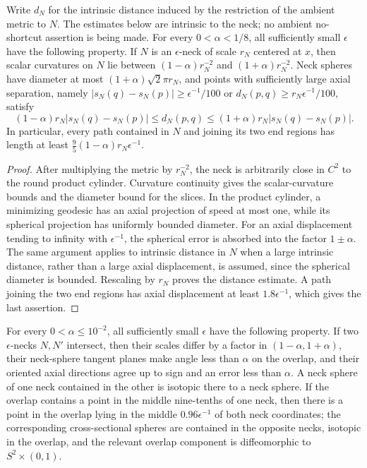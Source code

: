 \begin{lemma}
\label{lem:epsilon-neck-metric-control}
\notready
Write $d_N$ for the intrinsic distance induced by the restriction of the
ambient metric to $N$.  The estimates below are intrinsic to the neck; no
ambient no-shortcut assertion is being made.
For every $0<\alpha<1/8$, all sufficiently small $\epsilon$ have the
following property.  If $N$ is an $\epsilon$-neck of scale $r_N$ centered
at $x$, then scalar curvatures on $N$ lie between
$(1-\alpha)r_N^{-2}$ and $(1+\alpha)r_N^{-2}$.  Neck spheres have
diameter at most $(1+\alpha)\sqrt2\pi r_N$, and points with sufficiently
large axial separation, namely
$|s_N(q)-s_N(p)|\ge\epsilon^{-1}/100$ or
$d_N(p,q)\ge r_N\epsilon^{-1}/100$, satisfy
\[
 (1-\alpha)r_N|s_N(q)-s_N(p)|
 \le d_N(p,q)
 \le(1+\alpha)r_N|s_N(q)-s_N(p)|.
\]
In particular, every path contained in $N$ and joining its two end regions
has length at least
$\frac95(1-\alpha)r_N\epsilon^{-1}$.
\end{lemma}

\begin{proof}
After multiplying the metric by $r_N^{-2}$, the neck is arbitrarily close
in $C^2$ to the round product cylinder.  Curvature continuity gives the
scalar-curvature bounds and the diameter bound for the slices.  In the
product cylinder, a minimizing geodesic has an axial projection of speed at
most one, while its spherical projection has uniformly bounded diameter.
For an axial displacement tending to infinity with $\epsilon^{-1}$, the
spherical error is absorbed into the factor $1\pm\alpha$.  The same
argument applies to intrinsic distance in $N$ when a large intrinsic
distance, rather than a large axial displacement, is assumed, since the
spherical diameter is bounded.
Rescaling by $r_N$ proves the distance estimate.  A path joining the two end
regions has axial displacement at least $1.8\epsilon^{-1}$, which gives the
last assertion.
\end{proof}

\begin{proposition}
\label{prop:overlapping-epsilon-necks}
\notready
For every $0<\alpha\le10^{-2}$, all sufficiently small $\epsilon$ have
the following property.  If two $\epsilon$-necks $N,N'$ intersect, then
their scales differ by a factor in $(1-\alpha,1+\alpha)$, their neck-sphere
tangent planes make angle less than $\alpha$ on the overlap, and their
oriented axial directions agree up to sign and an error less than
$\alpha$.  A neck sphere of one neck contained in the other is isotopic
there to a neck sphere.  If the overlap contains a point in the middle
nine-tenths of one neck, then there is a point in the overlap lying in the
middle $0.96\epsilon^{-1}$ of both neck coordinates; the corresponding
cross-sectional spheres are contained in the opposite necks, isotopic in the
overlap, and the relevant overlap component is diffeomorphic to
$S^2\times(0,1)$.
\end{proposition}

